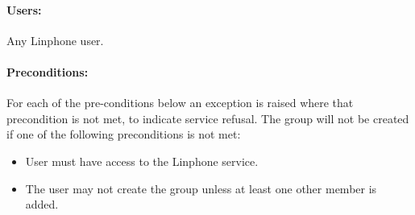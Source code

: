 \documentclass[11pt]{article}
\begin{document}
\paragraph{Users:}  Any Linphone user.
\paragraph{Preconditions:}For each of the pre-conditions below an exception is raised where that precondition is not met, to indicate service refusal.
The group will not be created if one of the following preconditions is not met:
\begin{itemize}
\item	User must have access to the Linphone service.
\item	The user may not create the group unless at least one other member is added.
\end{itemize}
\end{document}
